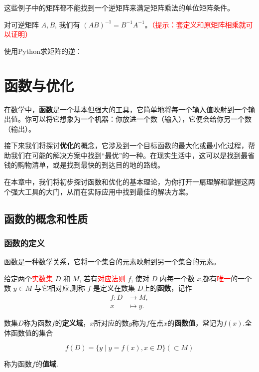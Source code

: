 \documentclass[lang=cn,newtx,10pt,scheme=chinese]{elegantbook}
\begin{document}
这些例子中的矩阵都不能找到一个逆矩阵来满足矩阵乘法的单位矩阵条件。

\begin{theorem}[矩阵的逆运算的性质]
    对可逆矩阵 $A, B$, 我们有 $(A B)^{-1}=B^{-1} A^{-1}$。\textcolor{red}{（提示：套定义和原矩阵相乘就可以证明）}
\end{theorem}

使用Python求矩阵的逆：



\chapter{函数与优化}

在数学中，\textcolor{main}{\bf 函数}是一个基本但强大的工具，它简单地将每一个输入值映射到一个输出值。你可以将它想象为一个机器：你放进一个数（输入），它便会给你另一个数（输出）。

接下来我们将探讨\textcolor{main}{\bf 优化}的概念，它涉及到一个目标函数的最大化或最小化过程，帮助我们在可能的解决方案中找到“最优”的一种。在现实生活中，这可以是找到最省钱的购物清单，或是找到最快的到达目的地的路线。

在本章中，我们将初步探讨函数和优化的基本理论，为你打开一扇理解和掌握这两个强大工具的大门，从而在实际应用中找到最佳的解决方案。

\section{函数的概念和性质}
\subsection{函数的定义}

\begin{note}
    函数是一种数学关系，它将一个集合的元素映射到另一个集合的元素。
\end{note}

\begin{definition}[函数]
给定两个\textcolor{red}{实数集} $D$ 和 $M$, 若有\textcolor{red}{对应法则} $f$, 使对 $D$ 内每一个数 $x$,都有\textcolor{red}{唯一}的一个数 $y \in M$ 与它相对应,则称 $f$ 是定义在数集 $D$上的\textcolor{third}{\bf 函数}，记作
\begin{equation}
\begin{aligned}
    f:D & \rightarrow M, \\
    x & \mapsto y.
\end{aligned}
\end{equation}

数集$D$称为函数$f$的\textcolor{third}{\bf 定义域}，$x$所对应的数$y$称为$f$在点$x$的\textcolor{third}{\bf 函数值}，常记为$f(x)$.全体函数值的集合

\begin{equation*}
    f(D) = \{y\mid y=f(x),x\in D\} (\subset M)
\end{equation*}

称为函数$f$的\textcolor{third}{\bf 值域}.

\end{definition}
\end{document}
